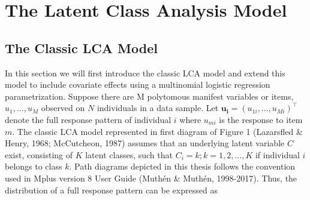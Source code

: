 \section{The Latent Class Analysis Model}

\subsection{The Classic LCA Model}
In this section we will first introduce the classic LCA model and extend this model to include covariate effects using a multinomial logistic regression parametrization. Suppose there are M polytomous manifest variables or items, $u_{1},...,u_{M}$ observed on $N$ individuals in a data sample. Let $\bm{u_{i}} = (u_{1i},...,u_{Mi})^{\intercal}$ denote the full response pattern of individual $i$ where $u_{mi}$ is the response to item $m$. The classic LCA model represented in first diagram of Figure 1 (Lazarsfled \& Henry, 1968; McCutcheon, 1987) assumes that an underlying latent variable $C$ exist, consisting of $K$ latent classes, such that $C_{i}=k; k=1,2,...,K$ if individual $i$ belongs to class $k$. Path diagrams depicted in this thesis follows the convention used in Mplus version 8 User Guide (Muth\'en \& Muth\'en, 1998-2017). Thus, the distribution of a full response pattern can be expressed as 

